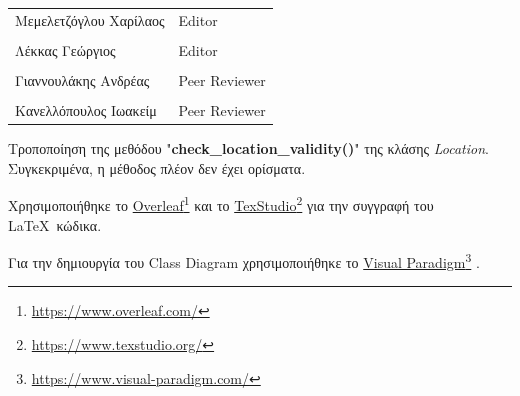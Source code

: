 \documentclass{../ol-softwaremanual}
\newcommand{\doclink}[2]{\href{#1}{#2}\footnote{\url{#1}}}
\begin{document}
	
	\vspace{20pt}
	
	\begin{table}[htbp!]
		\begin{tabular}{ll}
			Μεμελετζόγλου Χαρίλαος & \en Editor \\
			\\ Λέκκας Γεώργιος      &   \en  Editor \\
			\\ Γιαννουλάκης Ανδρέας & \en Peer Reviewer \\
			\\ Κανελλόπουλος Ιωακείμ & \en Peer Reviewer \\ 
		\end{tabular}
	\end{table}

	\flushleft
	
	Τροποποίηση της μεθόδου \en"\textbf{check\_location\_validity()}\en" \gr της κλάσης \en \textit{Location}\gr. Συγκεκριμένα, η μέθοδος πλέον δεν έχει ορίσματα.

	\vspace{20pt}
	
	\newpage 
	
	
	
	\vspace{20pt}
	\flushleft
	Χρησιμοποιήθηκε το \en \doclink{https://www.overleaf.com/}{Overleaf} \gr και το \en \doclink{https://www.texstudio.org/}{TexStudio} \gr για την συγγραφή του \LaTeX\ κώδικα. \break
	
	Για την δημιουργία του \en Class Diagram \gr χρησιμοποιήθηκε το \en \doclink{https://www.visual-paradigm.com/}{Visual Paradigm} \gr .
	
	\newpage
	
	
\end{document}
